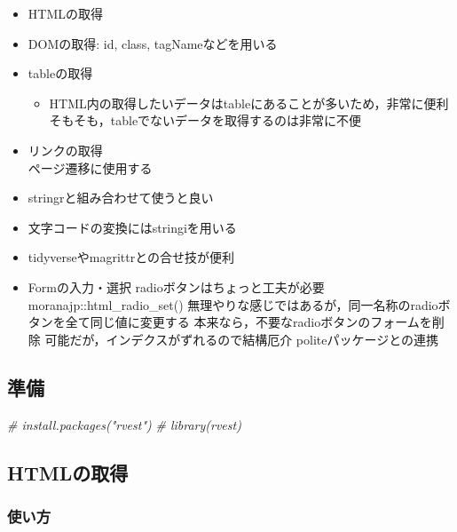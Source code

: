 \documentclass[
]{article}
\newenvironment{Shaded}{\begin{snugshade}}{\end{snugshade}}
\newcommand{\CommentTok}[1]{\textcolor[rgb]{0.56,0.35,0.01}{\textit{#1}}}
\providecommand{\tightlist}{%
  \setlength{\itemsep}{0pt}\setlength{\parskip}{0pt}}
\begin{document}
\begin{itemize}
\tightlist
\item
  HTMLの取得\\
\item
  DOMの取得: id, class, tagNameなどを用いる\\
\item
  tableの取得

  \begin{itemize}
  \tightlist
  \item
    HTML内の取得したいデータはtableにあることが多いため，非常に便利
    そもそも，tableでないデータを取得するのは非常に不便
  \end{itemize}
\item
  リンクの取得\\
  ページ遷移に使用する\\
\item
  stringrと組み合わせて使うと良い\\
\item
  文字コードの変換にはstringiを用いる\\
\item
  tidyverseやmagrittrとの合せ技が便利\\
\item
  Formの入力・選択
  radioボタンはちょっと工夫が必要
  moranajp::html\_radio\_set()
  無理やりな感じではあるが，同一名称のradioボタンを全て同じ値に変更する
  本来なら，不要なradioボタンのフォームを削除
  可能だが，インデクスがずれるので結構厄介
  politeパッケージとの連携
\end{itemize}

\hypertarget{ux6e96ux5099}{%
\subsection{準備}\label{ux6e96ux5099}}

\begin{Shaded}
\begin{Highlighting}[]
  \CommentTok{\# install.packages("rvest")}
  \CommentTok{\# library(rvest)}
\end{Highlighting}
\end{Shaded}

\hypertarget{htmlux306eux53d6ux5f97}{%
\subsection{HTMLの取得}\label{htmlux306eux53d6ux5f97}}

\hypertarget{ux4f7fux3044ux65b9-3}{%
\subsubsection{使い方}\label{ux4f7fux3044ux65b9-3}}
\end{document}
